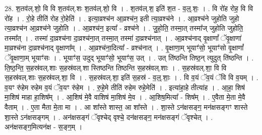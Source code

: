 \documentclass[17pt]{extarticle}
\begin{document}
28. श॒तव॑ल्.शो॒ वि वि श॒तव॑ल्.शः श॒तव॑ल्.शो॒ वि । . श॒तव॑ल्.श॒ इति॑ श॒त - व॒ल्॒.शः॒ । . वि रो॑ह रोह॒ वि वि रो॑ह । . रो॒हे तीति॑ रोह रो॒हेति॑ । . इत्या॒व्रश्च॑न आ॒व्रश्च॑न॒ इती त्या॒व्रश्च॑ने । . आ॒व्रश्च॑ने जुहोति जुहो त्या॒व्रश्च॑न आ॒व्रश्च॑ने जुहोति । . आ॒व्रश्च॑न॒ इत्या᳚ - व्रश्च॑ने । . जु॒हो॒ति॒ तस्मा॒त् तस्मा᳚ज् जुहोति जुहोति॒ तस्मा᳚त् । . तस्मा॑ दा॒व्रश्च॑ना दा॒व्रश्च॑ना॒त् तस्मा॒त् तस्मा॑ दा॒व्रश्च॑नात् । . आ॒व्रश्च॑नाद् वृ॒क्षाणां᳚ ॅवृ॒क्षाणा॑ मा॒व्रश्च॑ना दा॒व्रश्च॑नाद् वृ॒क्षाणा᳚म् । . आ॒व्रश्च॑ना॒दित्या᳚ - व्रश्च॑नात् । . वृ॒क्षाणा॒म् भूयाꣳ॑सो॒ भूयाꣳ॑सो वृ॒क्षाणां᳚ ॅवृ॒क्षाणा॒म् भूयाꣳ॑सः । . भूयाꣳ॑स॒ उदुद् भूयाꣳ॑सो॒ भूयाꣳ॑स॒ उत् । . उत् ति॑ष्ठन्ति तिष्ठ॒न् त्युदुत् ति॑ष्ठन्ति । . ति॒ष्ठ॒न्ति॒ स॒हस्र॑वल्.शाः स॒हस्र॑वल्.शा स्तिष्ठन्ति तिष्ठन्ति स॒हस्र॑वल्.शाः । . स॒हस्र॑वल्.शा॒ वि वि स॒हस्र॑वल्.शाः स॒हस्र॑वल्.शा॒ वि । . स॒हस्र॑वल्.शा॒ इति॑ स॒हस्र॑ - व॒ल्॒.शाः॒ । . वि व॒यं ॅव॒यं ॅवि वि व॒यम् । . व॒यꣳ रु॑हेम रुहेम व॒यं ॅव॒यꣳ रु॑हेम । . रु॒हे॒मे तीति॑ रुहेम रुहे॒मेति॑ । . इत्या॑हा॒हे तीत्या॑ह । . आ॒हा॒ शिष॑ मा॒शिष॑ माहा हा॒शिष᳚म् । . आ॒शिष॑ मे॒वै वाशिष॑ मा॒शिष॑ मे॒व । . आ॒शिष॒मित्या᳚ - शिष᳚म् । . ए॒वैता मे॒ता मे॒वै वैताम् । . ए॒ता मैता मे॒ता मा । . आ शा᳚स्ते शास्त॒ आ शा᳚स्ते । . शा॒स्ते ऽन॑क्षसङ्ग॒ मन॑क्षसङ्गꣳ शास्ते शा॒स्ते ऽन॑क्षसङ्गम् । . अन॑क्षसङ्गं ॅवृश्चेद् वृश्चे॒ दन॑क्षसङ्ग॒ मन॑क्षसङ्गं ॅवृश्चेत् । . अन॑क्षसङ्ग॒मित्यन॑क्ष - स॒ङ्ग॒म् । \newline
\end{document}
